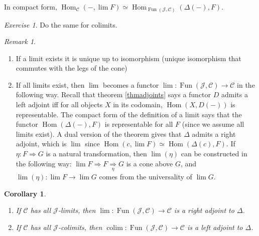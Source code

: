 \documentclass{article}
\newcommand{\cat}{\mathcal{C}}
\newcommand{\Jcat}{\mathcal{J}}
\DeclareMathOperator{\Hom}{Hom}
\DeclareMathOperator{\Fun}{Fun}
\DeclareMathOperator{\colim}{colim}
\theoremstyle{plain}
\newtheorem*{corollary}{Corollary}
\theoremstyle{definition}
\theoremstyle{remark}
\newtheorem*{remark}{Remark}
\newtheorem*{exercise}{Exercise}
\begin{document}
In compact form, $\Hom_\cat(-, \lim F) \simeq \Hom_{\Fun(\Jcat,\cat)} (\Delta(-),F)$.

\begin{exercise}
    Do the same for colimits.
\end{exercise}

\begin{remark}\leavevmode
    \begin{enumerate}
        \item If a limit exists it is unique up to isomorphism (unique isomorphism that commutes with the legs of the cone)
        \item If all limits exist, then $\lim$ becomes a functor $\lim : \Fun(\Jcat, \cat) \to \cat$ in the following way. Recall that theorem \ref{thmadjoints} says a functor $D$ admits a left adjoint iff for all objects $X$ in its codomain, $\Hom(X,D(-))$ is representable. The compact form of the definition of a limit says that the functor $\Hom(\Delta(-),F)$ is representable for all $F$ (since we assume all limits exist). A dual version of the theorem gives that $\Delta$ admits a right adjoint, which is $\lim$ since $\Hom(c,\lim F) \simeq \Hom(\Delta(c),F)$. If $\eta : F \Rightarrow G$ is a natural transformation, then $\lim(\eta)$ can be constructed in the following way: $\lim F \Rightarrow F \underset{\eta}{\Rightarrow} G$ is a cone above $G$, and $\lim(\eta) : \lim F \to \lim G$ comes from the universality of $\lim G$.
    \end{enumerate}
\end{remark}

\begin{corollary} \leavevmode
    \begin{enumerate}
        \item If $\cat$ has all $\Jcat$-limits, then $\lim : \Fun(\Jcat,\cat) \to \cat$ is a right adjoint to $\Delta$.
        \item If $\cat$ has all $\Jcat$-colimits, then $\colim : \Fun(\Jcat,\cat) \to \cat$ is a left adjoint to $\Delta$.
    \end{enumerate}
\end{corollary}
\end{document}
